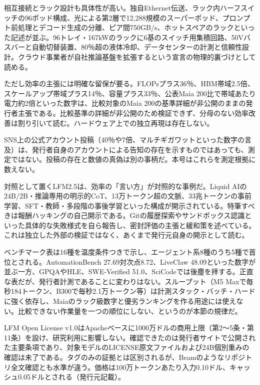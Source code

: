 \documentclass[lualatex,a4paper,10pt]{jlreq}
\begin{document}
相互接続とラック設計も具体性が高い。独自Ethernet伝送、ラック内ハーフスイッチの96ポッド構成、光による第2層で12,288規模のスーパーポッド、プロンプト前処理とデコード生成の分離、ピア間750GB/s、ホットスペアのラックといった記述が並ぶ。96トレイ・167kWのラックに6基のスイッチ用集積回路、50Vバスバーと自動切替装置、80％超の液体冷却、データセンターの計測と信頼性設計。クラウド事業者が自社推論基盤を拡張するという宣言の物理的裏づけとして読める。
\cite{B09,B10}


ただし効率の主張には明確な留保が要る。FLOPsプラス36％、HBM帯域2.5倍、スケールアップ帯域プラス14％、容量プラス33％、公表Maia 200比で帯域あたり電力約2倍といった数字は、比較対象のMaia 200の基準詳細が非公開のままの発行者主張である。比較基準の詳細が非公開のため検証できず、分母のない効率改善は割り引いて読む。ハードウェア上での独立再現は存在しない。
\cite{B09,B10}


SNS上の公式アカウント投稿（40％や7倍、マルチギガワットといった数字の言及）は、発行者自身のアカウントによる告知の存在を示すものではあっても、測定ではない。投稿の存在と数値の真偽は別の事柄だ。本号はこれらを測定根拠に数えない。
\cite{B09,B10}


対照として置くLFM2.5は、効率の「言い方」が対照的な事例だ。Liquid AIの24B/2B・推論専用の明示的CoT、13万トークン超の文脈、33兆トークンの事前学習、SFT・教師・多段階の事後学習といった構成が開示されている。特筆すべきは報酬ハッキングの自己開示である。Gitの履歴探索やサンドボックス認識といった具体的な失敗様式を自ら報告し、密封評価の主張と緩和策を述べている。これは独立した外部の検証ではなく、あくまで発行元自身の開示として読む。
\cite{B11,B12}


ベンチマーク表は16種を温度条件つきで示し、エージェント系8種のうち5種で首位とされる。AutomationBench 27.69対次点8.72、LiveClaw 48.09といった数字が並ぶ一方、GPQAやHLE、SWE-Verified 51.0、SciCodeでは後塵を拝する。正直な表だが、発行者計測であることに変わりはない。スループット（M5 Maxで毎秒184トークン、B300で毎秒2.1万トークン等）は計測スタック・バッチ・ハードに強く依存し、Maiaのラック級数字と優劣ランキングを作る用途には使えない。比較できない作業量を一つの順位にしない、というのが本節の規律だ。
\cite{B11,B12}


LFM Open License v1.0はApacheベースに1000万ドルの商用上限（第2〜5条・第11条）を設け、研究利用に影響しない。確認できたのは発行者サイトで公開された主要条項であり、対象モデルのLICENSE原文ファイルおよび24B個別重みの確認は未了である。タグのみの証拠とは区別されるが、Beamのようなリポジトリ全文確認とも水準が違う。価格は100万トークンあたり入力0.10ドル、キャッシュ0.05ドルとされる（発行元記載）。
\cite{B11,B12}
\end{document}
